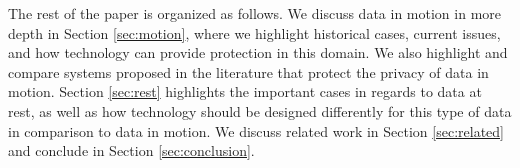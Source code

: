 The rest of the paper is organized as follows.  We discuss data in motion in
more depth in Section \ref{sec:motion}, where we highlight  historical cases,
current issues, and how technology can provide protection in this domain.  We
also highlight and compare systems proposed in the literature that protect the
privacy of data in motion. Section \ref{sec:rest} highlights the important
cases in regards to data at rest, as well as how technology should be designed
differently for this type of data in comparison to data in motion.  We discuss
related work in Section \ref{sec:related} and  conclude in Section
\ref{sec:conclusion}.
